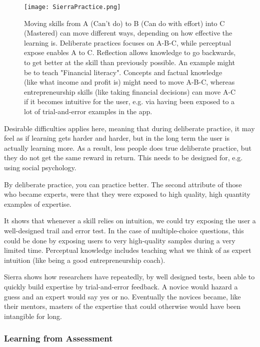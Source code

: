   \begin{figure}[h]
    \centering
    \texttt{[image: SierraPractice.png]}
    \caption{Moving skills from A (Can't do) to B (Can do with effort) into C (Mastered) can move different ways, depending on how effective the learning is. Deliberate practices focuses on A-B-C, while perceptual expose enables A to C. Reflection allows knowledge to go backwards, to get better at the skill than previously possible. An example might be to teach "Financial literacy". Concepts and factual knowledge (like what income and profit is) might need to move A-B-C, whereas entrepreneurship skills (like taking financial decisions) can move A-C if it becomes intuitive for the user, e.g. via having been exposed to a lot of trial-and-error examples in the app.}
    \label{fig:iterationprocess}
\end{figure}

  Desirable difficulties applies here, meaning that during deliberate practice, it may feel as if learning gets harder and harder, but in the long term the user is actually learning more. As a result, less people does true deliberate practice, but they do not get the same reward in return. This needs to be designed for, e.g. using social psychology.

  By deliberate practice, you can practice better. The second attribute of those who became experts, were that they were exposed to high quality, high quantity examples of expertise. \cite{sierra}

  It shows that whenever a skill relies on intuition, we could try exposing the user a well-designed trail and error test. In the case of multiple-choice questions, this could be done by exposing users to very high-quality samples during a very limited time. Perceptual knowledge includes teaching what we think of as expert intuition (like being a good entrepreneurship coach).

  Sierra shows how researchers have repeatedly, by well designed tests, been able to quickly build expertise by trial-and-error feedback. A novice would hazard a guess and an expert would say yes or no. Eventually the novices became, like their mentors, masters of the expertise that could otherwise would have been intangible for long.

  \subsubsection{Learning from Assessment}

